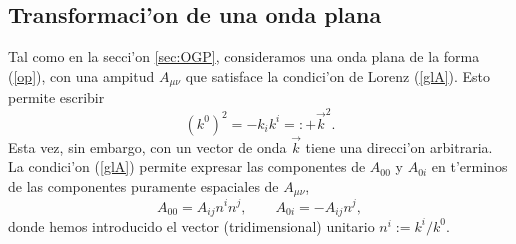 \subsection{Transformaci'on de una onda plana}\label{sec:TOP}
Tal como en la secci'on \ref{sec:OGP}, consideramos una onda plana de la forma (\ref{op}), con una ampitud $A_{\mu\nu}$ que satisface la condici'on de Lorenz  (\ref{glA}). Esto permite escribir
\begin{equation}
 (k^0)^2=-k_ik^i=:+\vec{k}^2.
\end{equation}
Esta vez, sin embargo, con un vector de onda $\vec{k}$ tiene una direcci'on arbitraria. La condici'on (\ref{glA}) permite expresar las componentes de $A_{00}$ y $A_{0i}$ en t'erminos de las componentes puramente espaciales de $A_{\mu\nu}$,
\begin{equation}\label{A000i}
A_{00}=A_{ij}n^in^j, \qquad A_{0i}=-A_{ij}n^j,
\end{equation}
donde hemos introducido el vector (tridimensional) unitario $n^i:=k^i/k^0$.

